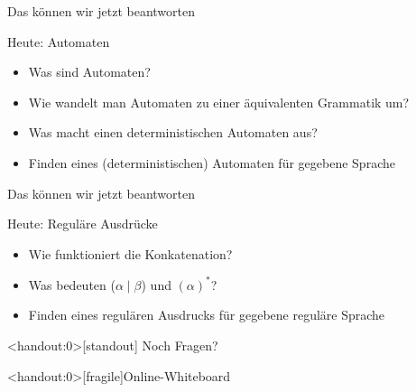 \begin{frame}[fragile]{Das können wir jetzt beantworten}
  \begin{alertblock}{Heute: Automaten}
    \begin{itemize}
      \item Was sind Automaten?
      \item Wie wandelt man Automaten zu einer äquivalenten Grammatik um?
      \item Was macht einen deterministischen Automaten aus?
      \item Finden eines (deterministischen) Automaten für gegebene Sprache
    \end{itemize}
  \end{alertblock}
\end{frame}

\begin{frame}[fragile]{Das können wir jetzt beantworten}
  \begin{alertblock}{Heute: Reguläre Ausdrücke}
    \begin{itemize}
      \item Wie funktioniert die Konkatenation?
      \item Was bedeuten ($\alpha \mid \beta$) und $(\alpha)^*$?
      \item Finden eines regulären Ausdrucks für gegebene reguläre Sprache
    \end{itemize}
  \end{alertblock}
\end{frame}

\begin{frame}<handout:0>[standout]
  Noch Fragen?
\end{frame}



\appendix
\begin{frame}<handout:0>[fragile]{Online-Whiteboard}
  \phantom{text}
\end{frame}


